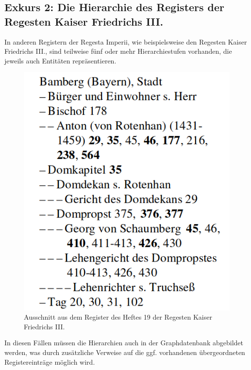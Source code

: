 \hypertarget{exkurs-2-die-hierarchie-des-registers-der-regesten-kaiser-friedrichs-iii.}{%
\subsection{Exkurs 2: Die Hierarchie des Registers der Regesten Kaiser
Friedrichs
III.}\label{exkurs-2-die-hierarchie-des-registers-der-regesten-kaiser-friedrichs-iii.}}

In anderen Registern der Regesta Imperii, wie beispielsweise den
Regesten Kaiser Friedrichs III., sind teilweise fünf oder mehr
Hierarchiestufen vorhanden, die jeweils auch Entitäten repräsentieren.

\begin{figure}
\centering
\includegraphics{Bilder/RI2Graph/ReggF3-Registerhierarchie.png}
\caption{Ausschnitt aus dem Register des Heftes 19 der Regesten Kaiser
Friedrichs III.}
\end{figure}

In diesen Fällen müssen die Hierarchien auch in der Graphdatenbank
abgebildet werden, was durch zusätzliche Verweise auf die ggf.
vorhandenen übergeordneten Registereinträge möglich wird.

